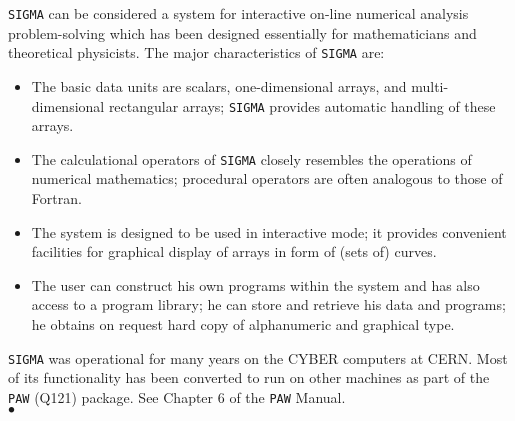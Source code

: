                           
                      
\Submitter{}                   
{\tt SIGMA} can be considered a system for interactive on-line numerical
analysis problem-solving which has been designed essentially for
mathematicians and theoretical physicists.
The major characteristics of {\tt SIGMA} are:
\begin{itemize}
\item  The basic data units are scalars, one-dimensional arrays, and
multi-dimensional rectangular arrays; {\tt SIGMA} provides automatic
handling of these arrays.
\item  The calculational operators of {\tt SIGMA} closely resembles the
operations of numerical mathematics; procedural operators are often
analogous to those of Fortran.
\item  The system is designed to be used in interactive mode; it
provides convenient facilities for graphical display of arrays in form
of (sets of) curves.
\item  The user can construct his own programs within the system
and has also access to a program library; he can store and retrieve his
data and programs; he obtains on request hard copy of alphanumeric and
graphical type.
\end{itemize}
{\tt SIGMA} was operational for many years on the CYBER computers
at CERN. Most of its functionality has been converted to run on other
machines as part of the {\tt PAW} (Q121) package.
\Usage
See Chapter 6 of the {\tt PAW} Manual.
\\ $\bullet$
